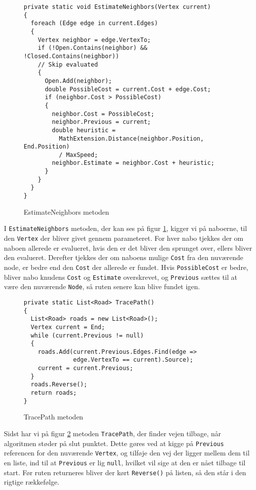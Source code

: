 \begin{figure}[H]
\begin{lstlisting}
private static void EstimateNeighbors(Vertex current)
{
  foreach (Edge edge in current.Edges)
  {
    Vertex neighbor = edge.VertexTo;
    if (!Open.Contains(neighbor) && !Closed.Contains(neighbor)) 
    // Skip evaluated
    {
      Open.Add(neighbor);
      double PossibleCost = current.Cost + edge.Cost;
      if (neighbor.Cost > PossibleCost)
      {
        neighbor.Cost = PossibleCost;
        neighbor.Previous = current;
        double heuristic = 
          MathExtension.Distance(neighbor.Position, End.Position) 
          / MaxSpeed;
        neighbor.Estimate = neighbor.Cost + heuristic;
      }
    }
  }
}
\end{lstlisting}
\caption{EstimateNeighbors metoden}\label{EstimateNeighborsCode}
\end{figure}

I \texttt{EstimateNeighbors} metoden, der kan ses på figur \ref{EstimateNeighborsCode}, kigger vi på naboerne, til den \texttt{Vertex} der bliver givet gennem parameteret. For hver nabo tjekkes der om naboen allerede er evalueret, hvis den er det bliver den sprunget over, ellers bliver den evalueret. Derefter tjekkes der om naboens mulige \texttt{Cost} fra den nuværende node, er bedre end den \texttt{Cost} der allerede er fundet. Hvis \texttt{PossibleCost} er bedre, bliver nabo knudens \texttt{Cost} og \texttt{Estimate} overskrevet, og \texttt{Previous} sættes til at være den nuværende \texttt{Node}, så ruten senere kan blive fundet igen.

\begin{figure}[H]
\begin{lstlisting}
private static List<Road> TracePath()
{
  List<Road> roads = new List<Road>();
  Vertex current = End;
  while (current.Previous != null)              
  { 
    roads.Add(current.Previous.Edges.Find(edge => 
              edge.VertexTo == current).Source);
    current = current.Previous;
  }
  roads.Reverse();
  return roads;
}
\end{lstlisting}
\caption{TracePath metoden}\label{TracePathCode}
\end{figure}

Sidst har vi på figur \ref{TracePathCode} metoden \texttt{TracePath}, der finder vejen tilbage, når algoritmen støder på slut punktet. Dette gøres ved at kigge på \texttt{Previous} referencen for den nuværende \texttt{Vertex}, og tilføje den vej der ligger mellem dem til en liste, ind til at \texttt{Previous} er lig \texttt{null}, hvilket vil sige at den er nået tilbage til start. Før ruten returneres bliver der kørt \texttt{Reverse()} på listen, så den står i den rigtige rækkefølge.